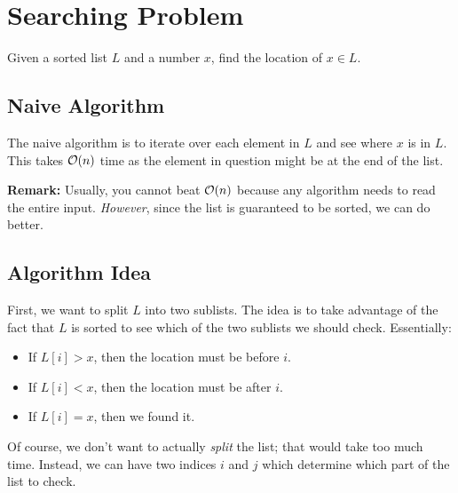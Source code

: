 \documentclass[letterpaper]{article}
\begin{document}
\section{Searching Problem}
Given a sorted list $L$ and a number $x$, find the location of $x \in L$.

\subsection{Naive Algorithm}
The naive algorithm is to iterate over each element in $L$ and see where $x$ is in $L$. This takes $\mathcal{O}(n)$ time as the element in question might be at the end of the list.  

\bigskip 

\textbf{Remark:} Usually, you cannot beat $\mathcal{O}(n)$ because any algorithm needs to read the entire input. \emph{However}, since the list is guaranteed to be sorted, we can do better.

\subsection{Algorithm Idea}
First, we want to split $L$ into two sublists. The idea is to take advantage of the fact that $L$ is sorted to see which of the two sublists we should check. Essentially:
\begin{itemize}
    \item If $L[i] > x$, then the location must be before $i$.
    \item If $L[i] < x$, then the location must be after $i$. 
    \item If $L[i] = x$, then we found it. 
\end{itemize}
Of course, we don't want to actually \emph{split} the list; that would take too much time. Instead, we can have two indices $i$ and $j$ which determine which part of the list to check. 
\end{document}
